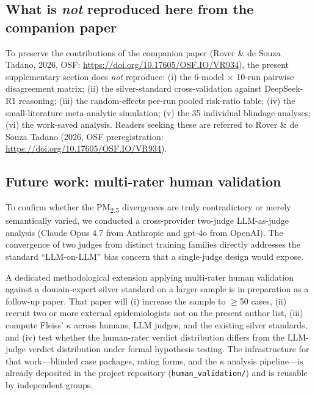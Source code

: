 \documentclass[11pt]{article}
\begin{document}
\subsection{What is \emph{not} reproduced here from the companion paper}

To preserve the contributions of the companion paper (Rover \& de Souza Tadano, 2026, OSF: \url{https://doi.org/10.17605/OSF.IO/VR934}), the present supplementary section does \emph{not} reproduce: (i) the 6-model $\times$ 10-run pairwise disagreement matrix; (ii) the silver-standard cross-validation against DeepSeek-R1 reasoning; (iii) the random-effects per-run pooled risk-ratio table; (iv) the small-literature meta-analytic simulation; (v) the 35 individual blindage analyses; (vi) the work-saved analysis. Readers seeking these are referred to Rover \& de Souza Tadano (2026, OSF preregistration: \url{https://doi.org/10.17605/OSF.IO/VR934}).

\subsection{Future work: multi-rater human validation}\label{sec:s12-future-work}

To confirm whether the PM\textsubscript{2.5} divergences are truly contradictory or merely semantically varied, we conducted a cross-provider two-judge LLM-as-judge analysis (Claude Opus 4.7 from Anthropic and gpt-4o from OpenAI). The convergence of two judges from distinct training families directly addresses the standard ``LLM-on-LLM'' bias concern that a single-judge design would expose.

A dedicated methodological extension applying multi-rater human validation against a domain-expert silver standard on a larger sample is in preparation as a follow-up paper. That paper will (i) increase the sample to $\geq$50 cases, (ii) recruit two or more external epidemiologists not on the present author list, (iii) compute Fleiss' $\kappa$ across humans, LLM judges, and the existing silver standards, and (iv) test whether the human-rater verdict distribution differs from the LLM-judge verdict distribution under formal hypothesis testing. The infrastructure for that work---blinded case packages, rating forms, and the $\kappa$ analysis pipeline---is already deposited in the project repository (\texttt{human\_validation/}) and is reusable by independent groups.


\end{document}
